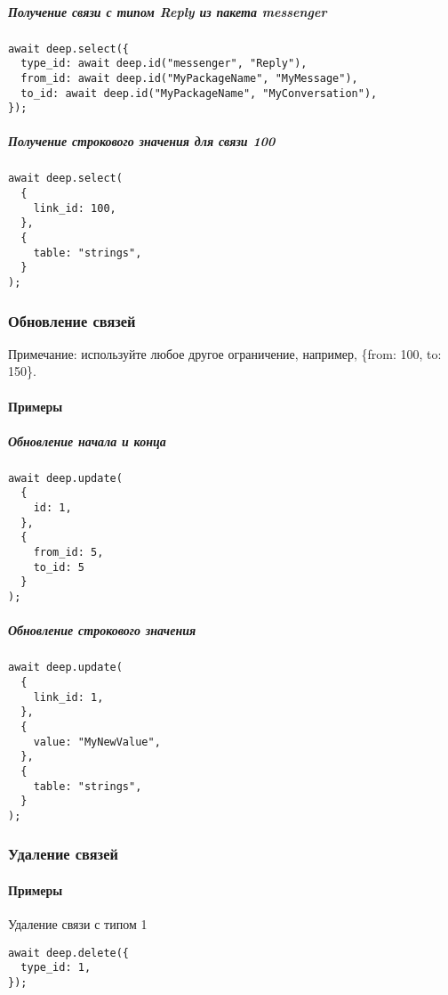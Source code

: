 \documentclass{article}
\begin{document}
\subparagraph{Получение связи с типом Reply из пакета messenger}
\begin{lstlisting}
await deep.select({
  type_id: await deep.id("messenger", "Reply"),
  from_id: await deep.id("MyPackageName", "MyMessage"),
  to_id: await deep.id("MyPackageName", "MyConversation"),
});
\end{lstlisting}

\subparagraph{Получение строкового значения для связи 100}
\begin{lstlisting}
await deep.select(
  {
    link_id: 100,
  },
  {
    table: "strings",
  }
);
\end{lstlisting}

\subsubsection{Обновление связей}

Примечание: используйте любое другое ограничение, например, \{from: 100, to:
150\}.

\paragraph{Примеры}

\subparagraph{Обновление начала и конца}
\begin{lstlisting}
await deep.update(
  {
    id: 1,
  },
  {
    from_id: 5,
    to_id: 5
  }
);
\end{lstlisting}

\subparagraph{Обновление строкового значения}
\begin{lstlisting}
await deep.update(
  {
    link_id: 1,
  },
  {
    value: "MyNewValue",
  },
  {
    table: "strings",
  }
);
\end{lstlisting}

\subsubsection{Удаление связей}

\paragraph{Примеры \\}

Удаление связи с типом 1

\begin{lstlisting}
await deep.delete({
  type_id: 1,
});
\end{lstlisting}
\end{document}
